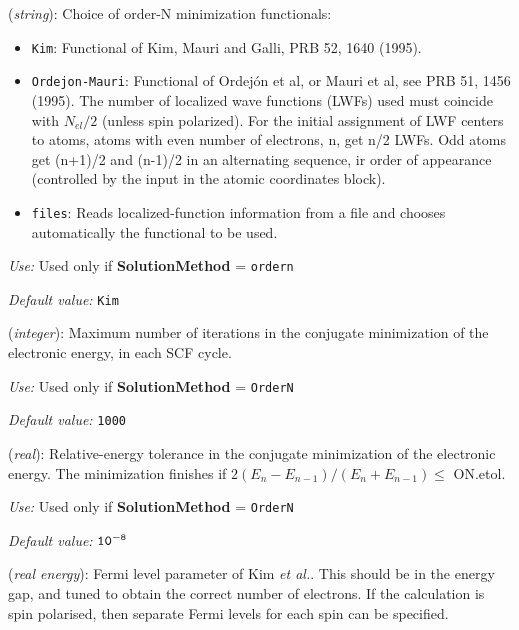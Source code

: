 \documentclass[11pt]{article}
\begin{document}
\begin{description}
\itemsep 10pt
\parsep 0pt
\item[{\bf ON.functional}] ({\it string}): 
Choice of order-N minimization functionals: 
\begin{itemize}
\item {\tt Kim}: 
Functional of Kim, Mauri and Galli, PRB 52, 1640 (1995).
\item {\tt Ordejon-Mauri}: 
Functional of Ordej\'on et al, or Mauri et al, see PRB 51, 1456 (1995).
The number of localized wave functions (LWFs) used must coincide with 
$N_{el}/2$ (unless spin polarized). 
For the initial assignment of LWF centers to atoms, atoms
with even number of electrons, n, get n/2 LWFs. Odd atoms
get (n+1)/2 and (n-1)/2 in an alternating sequence, ir order
of appearance (controlled by the input in the atomic coordinates block).

\item {\tt files}: 
Reads localized-function information from a file and 
chooses automatically the functional to be used. 
\end{itemize}

{\it Use:} Used only if {\bf SolutionMethod} = {\tt ordern}

{\it Default value:} {\tt Kim}

\item[{\bf ON.MaxNumIter}] ({\it integer}): 
Maximum number of iterations
in the conjugate minimization of the electronic
energy, in each SCF cycle.

{\it Use:} Used only if {\bf SolutionMethod} = {\tt OrderN}

{\it Default value:} {\tt 1000}

\item[{\bf ON.etol}] ({\it real}): 
Relative-energy tolerance in the conjugate minimization of the electronic
energy. The minimization finishes if 
\hspace{0.2truecm} $2 (E_n - E_{n-1}) / (E_n + E_{n-1}) \leq $ ON.etol.

{\it Use:} Used only if {\bf SolutionMethod} = {\tt OrderN}

{\it Default value:} ${\tt 10^{-8}}$

\item[{\bf ON.eta}] ({\it real energy}): 
Fermi level parameter of Kim 
{\it et al.}. This should be in the energy gap, and tuned to obtain
the correct number of electrons. If the calculation is spin polarised,
then separate Fermi levels for each spin can be specified.


\end{description}
\end{document}

